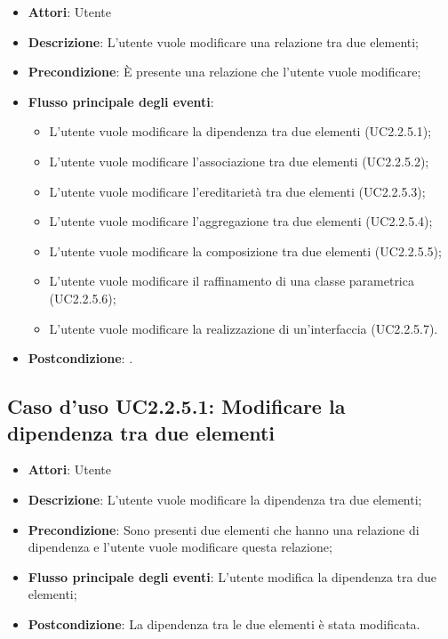\documentclass[../AnalisiDeiRequisiti.tex]{subfiles}
\begin{document}
			\begin{itemize}
				\item \textbf{Attori}: Utente
				\item \textbf{Descrizione}: L'utente vuole modificare una relazione tra due elementi;
				\item \textbf{Precondizione}: È presente una relazione che l'utente vuole modificare;
				\item \textbf{Flusso principale degli eventi}: \begin{itemize}
					\item L'utente vuole modificare la dipendenza tra due elementi (UC2.2.5.1);
					\item L'utente vuole modificare l'associazione tra due elementi (UC2.2.5.2);
					\item L'utente vuole modificare l'ereditarietà tra due elementi (UC2.2.5.3);
					\item L'utente vuole modificare l'aggregazione tra due elementi (UC2.2.5.4);
					\item L'utente vuole modificare la composizione tra due elementi (UC2.2.5.5);
					\item L'utente vuole modificare il raffinamento di una classe parametrica (UC2.2.5.6);
					\item L'utente vuole modificare la realizzazione di un'interfaccia (UC2.2.5.7).
				\end{itemize}
				\item \textbf{Postcondizione}: .
			\end{itemize}
			\subsection{Caso d'uso UC2.2.5.1: Modificare la dipendenza tra due elementi}
			\begin{itemize}
				\item \textbf{Attori}: Utente
				\item \textbf{Descrizione}: L'utente vuole modificare la dipendenza tra due elementi;
				\item \textbf{Precondizione}: Sono presenti due elementi che hanno una relazione di dipendenza e l'utente vuole modificare questa relazione;
				\item \textbf{Flusso principale degli eventi}: L'utente modifica la dipendenza tra due elementi;
				\item \textbf{Postcondizione}: La dipendenza tra le due elementi è stata modificata.
			\end{itemize}
\end{document}
